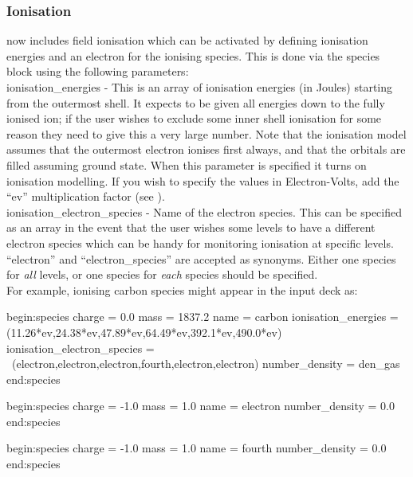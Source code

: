 \subsubsection{Ionisation}
\label{sec:ionisation}

{\EPOCH} now includes field ionisation which can be activated by defining
ionisation energies and an electron for the ionising species. This is done
via the species block using the following parameters:\\

{\emphtext ionisation\_energies} - This is an array of ionisation energies
  (in Joules) starting from the outermost shell. It expects to be given all
  energies down to the fully ionised ion; if the user wishes to exclude some
  inner shell ionisation for some reason they need to give this a very large
  number. Note that the ionisation model assumes that the outermost electron
  ionises first always, and that the orbitals are filled assuming ground
  state. When this parameter is specified it turns on ionisation modelling.
  If you wish to specify the values in Electron-Volts, add the ``ev''
  multiplication factor (see ).\\

{\emphtext ionisation\_electron\_species} - Name of the electron species. This
  can be specified as an array in the event that the user wishes some levels
  to have a different electron species which can be handy for monitoring
  ionisation at specific levels. ``electron'' and ``electron\_species'' are
  accepted as synonyms. Either one species for \emph{all} levels, or one species
  for \emph{each} species should be specified. \\

For example, ionising carbon species might appear in the input deck as:

\begin{boxverbatim}
begin:species
   charge = 0.0
   mass = 1837.2
   name = carbon
   ionisation_energies = (11.26*ev,24.38*ev,47.89*ev,64.49*ev,392.1*ev,490.0*ev)
   ionisation_electron_species = \
       (electron,electron,electron,fourth,electron,electron)
   number_density = den_gas
end:species

begin:species
   charge = -1.0
   mass = 1.0
   name = electron
   number_density = 0.0
end:species

begin:species
   charge = -1.0
   mass = 1.0
   name = fourth
   number_density = 0.0
end:species
\end{boxverbatim}

